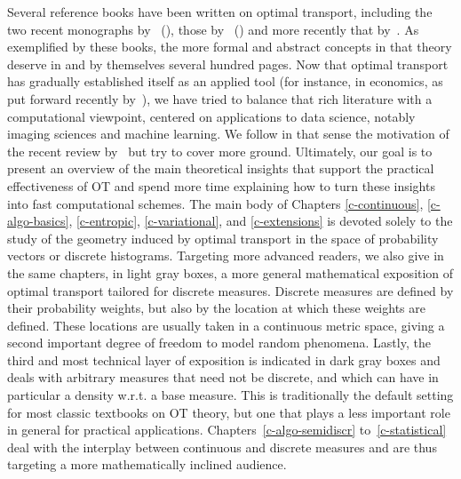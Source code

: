 Several reference books have been written on optimal transport, including the two recent monographs by~\citeauthor{Villani03} (\citeyear{Villani03,Villani09}), those by~\citeauthor{rachev1998mass} (\citeyear{rachev1998mass,rachev1998mass2}) and more recently that by~\citet{SantambrogioBook}. As exemplified by these books, the more formal and abstract concepts in that theory deserve in and by themselves several hundred pages. Now that optimal transport has gradually established itself as an applied tool (for instance, in economics, as put forward recently by~\citet{galichon2016optimal}), we have tried to balance that rich literature with a computational viewpoint, centered on applications to data science, notably imaging sciences and machine learning. We follow in that sense the motivation of the recent review by~\citet{kolouri2017optimal} but try to cover more ground.
%
Ultimately, our goal is to present an overview of the main theoretical insights that support the practical effectiveness of OT and spend more time explaining how to turn these insights into fast computational schemes. 
%
The main body of Chapters \ref{c-continuous}, \ref{c-algo-basics}, \ref{c-entropic}, \ref{c-variational}, and \ref{c-extensions} is devoted solely to the study of the geometry induced by optimal transport in the space of probability vectors or discrete histograms. 
%
Targeting more advanced readers, we also give in the same chapters,  in light gray boxes, a more general mathematical exposition of optimal transport tailored for discrete measures. Discrete measures are defined by their probability weights, but also by the location at which these weights are defined. These locations are usually taken in a continuous metric space, giving a second important degree of freedom to model random phenomena.
%
Lastly, the third and most technical layer of exposition is indicated in dark gray boxes and deals with arbitrary measures that need not be discrete, and which can have in particular a density w.r.t. a base measure. This is traditionally the default setting for most classic textbooks on OT theory, but one that plays a less important role in general for practical applications.
%
Chapters~\ref{c-algo-semidiscr} to~\ref{c-statistical} deal with the interplay between continuous and discrete measures and are thus targeting a more mathematically inclined audience. 

